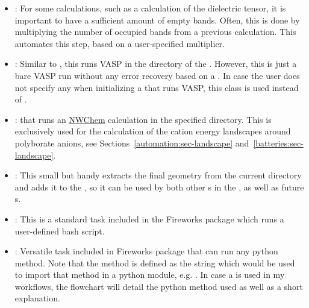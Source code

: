\begin{refsection}
\begin{itemize} 
 
 \label{automation:sec-IncreaseNumberOfBands} 
\item {}: For some calculations, such as a 
calculation of the dielectric tensor, it is important to have a sufficient 
amount of empty bands. Often, this is done by multiplying the number of 
occupied bands from a previous calculation. This  automates 
this step, based on a user-specified multiplier. 
 
 \label{automation:sec-VaspTask} 
\item {}: Similar to 
, this 
 runs VASP in the directory of the . 
However, this is just a bare VASP run without any error recovery 
based on a . In case the user does not specify any 
 when initializing a  that runs 
VASP, this class is used instead of . 
 
 \label{automation:sec-NWChemTask} 
\item {}:  that runs an 
\href{http://www.nwchem-sw.org/index.php/Main_Page}{NWChem} calculation in 
the specified directory. This is exclusively used for the calculation of the 
cation energy landscapes around polyborate anions, see Sections~\ref{automation:sec-landscape} and~\ref{batteries:sec-landscape}.
 
 \label{automation:sec-AddFinalGeometryToSpec} 
\item {}: This small but handy  
extracts the final geometry from the current directory and adds it to the 
, so it can be used by both other s in the 
, as well as future s. 
 
 \label{automation:sec-ScriptTask} 
\item {}: This is a standard task included in the Fireworks package 
which runs a user-defined bash script. 
 
 \label{automation:sec-PyTask} 
\item {}: Versatile task included in Fireworks package that can run 
any python method. Note that the method is defined as the string which would 
be used to import that method in a python module, e.g. 
. In case a 
 is used in my workflows, the flowchart will detail the python 
method used as well as a short explanation. 


\end{itemize}
\end{refsection}

